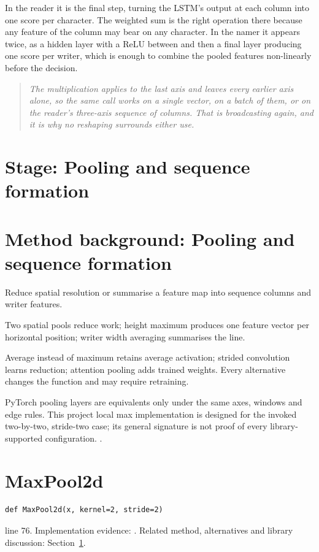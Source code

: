 In the reader it is the final step, turning the LSTM's output at each column into one score per character. The weighted sum is the right operation there because any feature of the column may bear on any character. In the namer it appears twice, as a hidden layer with a ReLU between and then a final layer producing one score per writer, which is enough to combine the pooled features non-linearly before the decision.


\begin{quote}\small\itshape The multiplication applies to the last axis and leaves every earlier axis alone, so the same call works on a single vector, on a batch of them, or on the reader's three-axis sequence of columns. That is broadcasting again, and it is why no reshaping surrounds either use.\end{quote}


\section*{Stage: Pooling and sequence formation}
\section{Method background: Pooling and sequence formation}\label{method:pool}
Reduce spatial resolution or summarise a feature map into sequence columns and writer features.


Two spatial pools reduce work; height maximum produces one feature vector per horizontal position; writer width averaging summarises the line.


Average instead of maximum retains average activation; strided convolution learns reduction; attention pooling adds trained weights. Every alternative changes the function and may require retraining.


PyTorch pooling layers are equivalents only under the same axes, windows and edge rules. This project local max implementation is designed for the invoked two-by-two, stride-two case; its general signature is not proof of every library-supported configuration. \cite{shi2017,torchpool}.


\section{MaxPool2d}\label{fn:recognise:MaxPool2d}
\begin{lstlisting}[style=sig]
def MaxPool2d(x, kernel=2, stride=2)
\end{lstlisting}
 line 76. Implementation evidence: \cite{code2026}. Related method, alternatives and library discussion: Section~\ref{method:pool}.


